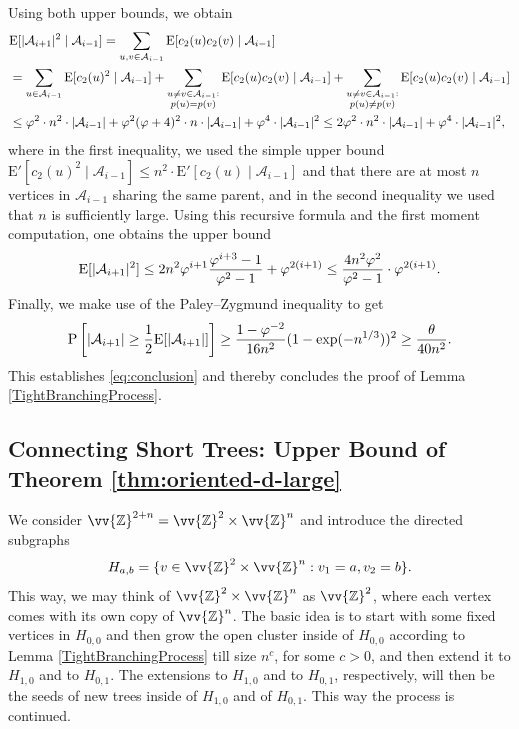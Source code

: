 \documentclass[11pt]{article}
\renewcommand{\P}{\mathrm{P}}
\newcommand{\Z}{\mathbb{Z}}
\newcommand{\A}{\mathcal{A}}
\DeclarePairedDelimiter{\abs}{\lvert}{\rvert}
\theoremstyle{remark}
\begin{document}
    Using both upper bounds, we obtain
    \begin{align}
        &\mathrm E[ \abs{\A_{i+1}}^2 \mid \A_{i-1}] = \sum_{u,v \in \A_{i-1}} \mathrm E[ c_2(u) c_2(v) \mid \A_{i-1}] \\
         &= \sum_{u \in \A_{i-1}} \mathrm E[ c_2(u)^2 \mid \A_{i-1}] +  \sum_{\substack{u\neq v \in \A_{i-1}: \\ p(u)=p(v)}} \mathrm E[ c_2(u) c_2(v) \mid \A_{i-1}] + \sum_{\substack{u\neq v \in \A_{i-1}: \\ p(u)\neq p(v)}} \mathrm E[ c_2(u) c_2(v) \mid \A_{i-1}]\\        
         &\le \varphi^2 \cdot n^2 \cdot \abs{\A_{i-1}} +  \varphi^2 (\varphi+4)^2 \cdot n\cdot  \abs{\A_{i-1}}+ \varphi^4 \cdot  \abs{\A_{i-1}}^2 \le 2\varphi^2 \cdot n^2 \cdot \abs{\A_{i-1}} + \varphi^4 \cdot \abs{\A_{i-1}}^2,
    \end{align}
    where in the first inequality, we used the simple upper bound $\mathrm E'[ c_2(u)^2 \mid \A_{i-1}] \le n^2 \cdot \mathrm E'[ c_2(u) \mid \A_{i-1}]$ and that there are at most $n$ vertices in $\A_{i-1}$ sharing the same parent, and in the second inequality we used that $n$ is sufficiently large. 
    Using this recursive formula and the first moment computation, one obtains the upper bound
    \begin{equation}
        \mathrm E[ \abs{\A_{i+1}}^2] \leq  2n^2 \varphi^{i+1} \frac{\varphi^{i+3}-1}{\varphi^2-1}+ \varphi^{2(i+1)} \le \frac{4n^2\varphi^2}{\varphi^2-1} \cdot \varphi^{2(i+1)} .
    \end{equation}
    Finally, we make use of the Paley–Zygmund inequality to get
    \begin{equation}
        \P\left[\abs{\A_{i+1}} \ge \frac{1}{2} \mathrm E[ \abs{\A_{i+1}}] \right] \geq \frac{1-\varphi^{-2}}{16 n^2}  (1-\exp(-n^{1/3}))^2 \ge \frac{\theta}{40 n^2}.
    \end{equation}
    This establishes \eqref{eq:conclusion} and thereby concludes the proof of Lemma \ref{TightBranchingProcess}.

\subsection{Connecting Short Trees: Upper  Bound of Theorem \ref{thm:oriented-d-large}}\label{Sec:Connecting}

We consider  $\vv{\Z}^{2+n} = \vv{\Z}^{2} \times \vv{\Z}^{n}$ and introduce the directed subgraphs $$H_{a,b} = \{v \in \vv{\Z}^{2} \times \vv{\Z}^{n}: v_1 = a, v_2 = b\}.$$ This way, we may think of $\vv{\Z}^{2} \times \vv{\Z}^{n}$ as $\vv{\Z}^{2}$, where each vertex comes with its own copy of $\vv{\Z}^{n}$.  The basic idea is to start with some fixed vertices in $H_{0,0}$ and then grow the open cluster inside of $H_{0,0}$ according to Lemma \ref{TightBranchingProcess} till size $n^{c}$, for some $c > 0$, and then extend it to $H_{1,0}$ and to $H_{0,1}$. The extensions to $H_{1,0}$ and to $H_{0,1}$, respectively, will then be the seeds of new trees inside of $H_{1,0}$ and of $H_{0,1}$. This way the process is continued.
\end{document}
